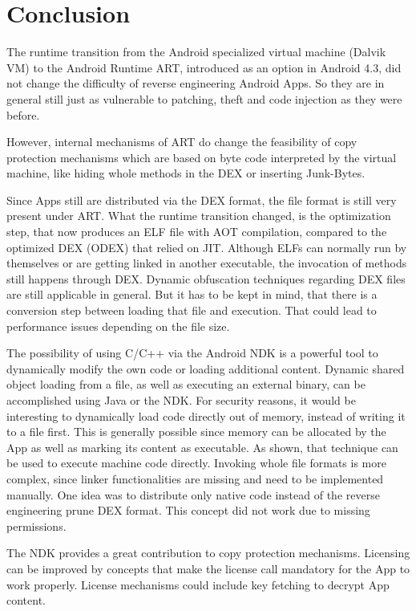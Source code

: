 \chapter{Conclusion}\label{chapter:conclusion}
The runtime transition from the Android specialized virtual machine (Dalvik VM)
to the Android Runtime ART, introduced as an option in Android 4.3, did not change the difficulty of reverse engineering Android Apps. So they are in general still just as vulnerable to patching, theft and code injection as they were before.

However, internal mechanisms of ART do change the feasibility of copy protection mechanisms which are based on byte code interpreted by the virtual machine, like hiding whole methods in the DEX or inserting Junk-Bytes.

Since Apps still are distributed via the DEX
format, the file format is still very present under ART.
What the runtime transition changed, is the optimization step, that now produces an ELF file with AOT compilation, compared to the optimized
DEX (ODEX) that relied on JIT.
Although ELFs can normally run by themselves or are getting linked in another executable, the invocation of methods still happens through DEX.
Dynamic obfuscation techniques regarding DEX files are still applicable in general. But it has to be kept in mind, that there is a conversion step between loading that file and execution.
That could lead to performance issues depending on the file size.

The possibility of using C/C++ via the Android NDK is a
powerful tool to dynamically modify the own code or loading additional
content.
Dynamic shared object loading from a file, as well as executing an external binary, can be accomplished using Java or the NDK.
For security reasons, it
would be interesting to dynamically load code directly out of memory, instead
of writing it to a file first.
This is generally possible since memory can be allocated by the App as well as marking its content as executable.
As shown, that technique can be used to execute machine code directly. Invoking whole file formats is more complex, since linker functionalities are missing and need to be implemented manually.
One idea was to distribute only native code instead of the reverse engineering prune DEX format. This concept did not work due to missing permissions.

The NDK provides a great contribution to copy protection mechanisms.
Licensing can be improved by concepts that make the license call mandatory for the App to work properly.
License mechanisms could include key fetching to decrypt App content.

